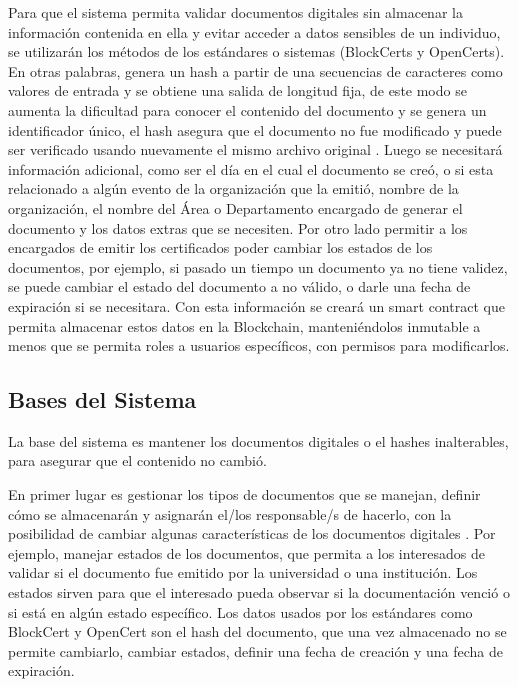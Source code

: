 Para que el sistema permita validar documentos digitales sin almacenar la información contenida en ella y 
evitar acceder a datos sensibles de un individuo, se utilizarán los métodos de los estándares o sistemas (BlockCerts y OpenCerts). En otras palabras, genera
un hash a partir de una secuencias de caracteres como valores de entrada y  se obtiene una salida de longitud fija, de este modo se  aumenta la dificultad
para conocer el contenido del documento y se genera un identificador único, el hash asegura que el documento no fue modificado y puede ser verificado usando nuevamente 
el mismo archivo original \cite[]{blockcerts_introduction_nodate,jirgensons_Blockchain_2018}.
Luego se necesitará información adicional, como ser el día en el cual el documento se creó, o si esta relacionado a algún evento de la organización que la emitió,
nombre de la organización, el nombre del Área o Departamento encargado de generar el documento y los datos extras que se necesiten. Por otro lado 
permitir a los encargados de emitir los certificados poder cambiar los estados de los documentos, por ejemplo, si pasado un tiempo un documento
ya no tiene validez, se puede cambiar el estado del documento a no válido, o darle una fecha de expiración si se necesitara.
Con esta información se creará   un smart contract que permita almacenar estos datos en la Blockchain, manteniéndolos inmutable 
a menos que se permita roles a usuarios específicos, con permisos para modificarlos.

\subsection{Bases del Sistema}\label{ss:basesistema}
La base del sistema es  mantener los documentos digitales o el hashes inalterables, para asegurar
que el contenido no cambió.

En primer lugar es gestionar los tipos de documentos que se manejan, definir cómo se almacenarán y asignarán  el/los
responsable/s de hacerlo, con la  posibilidad de cambiar algunas características de los documentos digitales \cite[]{opencerts_gestion_nodate}.
Por ejemplo, manejar estados de los documentos, que permita a los interesados de validar si el documento
fue emitido por la universidad o una institución. Los estados sirven para 
que el interesado pueda observar si la documentación venció o si está en algún estado específico.   
Los datos usados por los estándares como BlockCert y OpenCert son el hash del documento, que una vez almacenado
no se permite cambiarlo, cambiar estados, definir una fecha de creación y una fecha de expiración.

